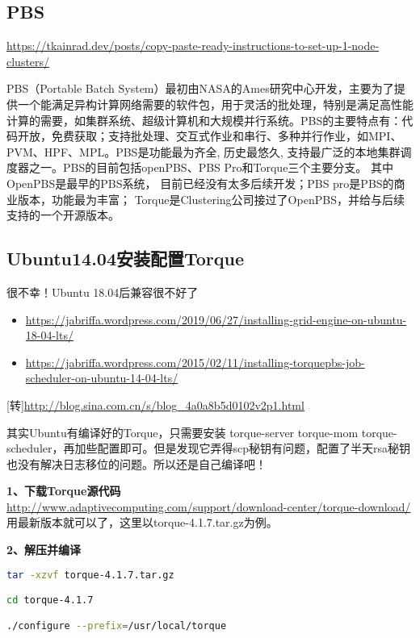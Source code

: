 {\subsection{PBS}

\url{https://tkainrad.dev/posts/copy-paste-ready-instructions-to-set-up-1-node-clusters/}

PBS（Portable Batch System）最初由NASA的Ames研究中心开发，主要为了提供一个能满足异构计算网络需要的软件包，用于灵活的批处理，特别是满足高性能计算的需要，如集群系统、超级计算机和大规模并行系统。PBS的主要特点有：代码开放，免费获取；支持批处理、交互式作业和串行、多种并行作业，如MPI、PVM、HPF、MPL。PBS是功能最为齐全, 历史最悠久, 支持最广泛的本地集群调度器之一。PBS的目前包括openPBS、PBS Pro和Torque三个主要分支。 其中OpenPBS是最早的PBS系统， 目前已经没有太多后续开发；PBS pro是PBS的商业版本，功能最为丰富； Torque是Clustering公司接过了OpenPBS，并给与后续支持的一个开源版本。


\subsection{Ubuntu14.04安装配置Torque}
{\color{red} 很不幸！Ubuntu 18.04后兼容很不好了}
\begin{itemize}
\item \url{https://jabriffa.wordpress.com/2019/06/27/installing-grid-engine-on-ubuntu-18-04-lts/}
\item \url{https://jabriffa.wordpress.com/2015/02/11/installing-torquepbs-job-scheduler-on-ubuntu-14-04-lts/}
\end{itemize}


[转]\url{http://blog.sina.com.cn/s/blog_4a0a8b5d0102v2p1.html}

其实Ubuntu有编译好的Torque，只需要安装 torque-server torque-mom torque-scheduler，再加些配置即可。但是发现它弄得scp秘钥有问题，配置了半天rsa秘钥也没有解决日志移位的问题。所以还是自己编译吧！

\textbf{1、下载Torque源代码}\\
\url{http://www.adaptivecomputing.com/support/download-center/torque-download/}\\
用最新版本就可以了，这里以torque-4.1.7.tar.gz为例。

\textbf{2、解压并编译}

\begin{lstlisting}[language=sh]
tar -xzvf torque-4.1.7.tar.gz

cd torque-4.1.7

./configure --prefix=/usr/local/torque
\end{lstlisting}

}
